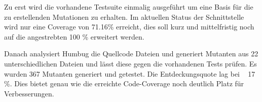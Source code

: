 Zu erst wird die vorhandene Testsuite einmalig ausgeführt um eine Basis für die zu erstellenden Mutationen zu erhalten. Im aktuellen Status der Schnittstelle wird nur eine Coverage von 71.16\% erreicht, dies soll kurz und mittelfristig noch auf die angestrebten 100 \% erweitert werden.

Danach analysiert Humbug die Quellcode Dateien und generiert Mutanten aus 22 unterschiedlichen Dateien und lässt diese gegen die vorhandenen Tests prüfen. Es wurden 367 Mutanten generiert und getestet. Die Entdeckungsquote lag bei ~ 17 \%. Dies bietet genau wie die erreichte Code-Coverage noch deutlich Platz für Verbesserungen.



